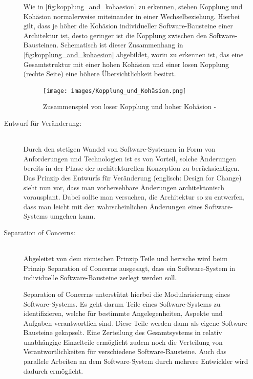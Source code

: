 \begin{description}
    Wie in \autoref{fig:kopplung_and_kohaesion} zu erkennen, stehen Kopplung und Kohäsion normalerweise miteinander in einer Wechselbeziehung. Hierbei gilt, dass je höher die Kohäsion individueller Software-Bausteine einer Architektur ist, desto geringer ist die Kopplung zwischen den Software-Bausteinen. Schematisch ist dieser Zusammenhang in \autoref{fig:kopplung_and_kohaesion} abgebildet, worin zu erkennen ist, das eine Gesamtstruktur mit einer hohen Kohäsion und einer losen Kopplung (rechte Seite) eine höhere Übersichtlichkeit besitzt.

    \begin{figure}[H]
        \centering
        \texttt{[image: images/Kopplung\_und\_Kohäsion.png]}
        \caption{Zusammenspiel von loser Kopplung und hoher Kohäsion - \cite{Vogel.2009}}
        \label{fig:kopplung_and_kohaesion}
    \end{figure}

    \item[Entwurf für Veränderung:]\hfill \\
    Durch den stetigen Wandel von Software-Systemen in Form von Anforderungen und Technologien ist es von Vorteil, solche Änderungen bereits in der Phase der architekturellen Konzeption zu berücksichtigen. Das Prinzip des Entwurfs für Veränderung (englisch: Design for Change) sieht nun vor, dass man vorhersehbare Änderungen architektonisch vorausplant. Dabei sollte man versuchen, die Architektur so zu entwerfen, dass man leicht mit den wahrscheinlichen Änderungen eines Software-Systems umgehen kann.

    \item[Separation of Concerns:]\hfill \\
    Abgeleitet von dem römischen Prinzip \glqq Teile und herrsche\grqq{} wird beim Prinzip Separation of Concerns ausgesagt, dass ein Software-System in individuelle Software-Bausteine zerlegt werden soll.

    Separation of Concerns unterstützt hierbei die Modularisierung eines Software-Systems. Es geht darum Teile eines Software-Systems zu identifizieren, welche für bestimmte Angelegenheiten, Aspekte und Aufgaben verantwortlich sind. Diese Teile werden dann als eigene Software-Bausteine gekapselt. Eine Zerteilung des Gesamtsystems in relativ unabhängige Einzelteile ermöglicht zudem noch die Verteilung von Verantwortlichkeiten für verschiedene Software-Bausteine. Auch das parallele Arbeiten an dem Software-System durch mehrere Entwickler wird dadurch ermöglicht.


\end{description}
